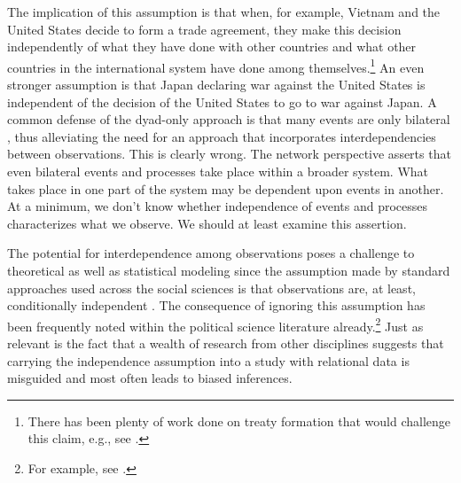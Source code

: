\documentclass[12pt,pdflatex]{elsarticle}
\begin{document}
The implication of this assumption is that when, for example, Vietnam and the United States decide to form a trade agreement, they make this decision independently of what they have done with other countries and what other countries in the international system have done among themselves.\footnote{There has been plenty of work done on treaty formation that would challenge this claim, e.g., see \citet{manger:etal:2012,kinne:2013}.} An even stronger assumption is that Japan declaring war against the United States is independent of the decision of the United States to go to war against Japan.
A common defense of the dyad-only approach is that many events are only bilateral \citep{diehl:wright:2016}, thus alleviating the need for an approach that incorporates interdependencies between observations. This is clearly wrong. The network perspective asserts that even bilateral events and processes take place within a broader system. What takes place in one part of the system may be dependent upon events in another. At a minimum, we don't know whether independence of events and processes characterizes what we observe. We should at least examine this assertion.  

The potential for interdependence among observations poses a challenge to theoretical as well as statistical modeling since the assumption made by standard approaches used across the social sciences is that observations are, at least, conditionally independent \citep{snijders:2011}. The consequence of ignoring this assumption has been frequently noted within the political science literature already.\footnote{For example, see \citet{beck:etal:1998,signorino:1999,hoff:ward:2004,erikson:pinto:2014}.}  Just as relevant is the fact that a wealth of research from other disciplines suggests that carrying the independence assumption into a study with relational data is misguided and most often leads to biased inferences.%
\end{document}

